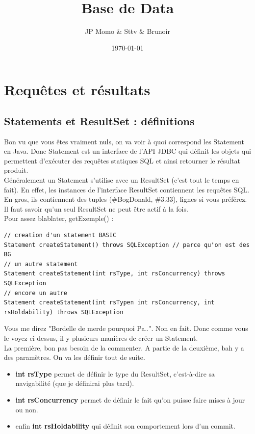 \documentclass{report}
\title{Base de Data}
\author{JP Momo \& Sttv \& Brunoir}
\date{\today}
\begin{document}
\maketitle{}

\chapter{Requêtes et résultats}
\section{Statements et ResultSet : définitions}

Bon vu que vous êtes vraiment nuls, on va voir à quoi correspond les Statement en Java. Donc Statement est un interface de l'API JDBC qui définit les objets qui permettent d'exécuter des requêtes statiques SQL et ainsi retourner le résultat produit.\\
Généralement un Statement s'utilise avec un ResultSet (c'est tout le temps en fait). En effet, les instances de l'interface ResultSet contiennent les requêtes SQL. En gros, ils contiennent des tuples (\#BogDonald, \#3.33), lignes si vous préférez. Il faut savoir qu'un seul ResultSet ne peut être actif à la fois.\\
Pour assez blablater, getExemple() :
\begin{lstlisting}[style=MyJavaStyle]
// creation d'un statement BASIC
Statement createStatement() throws SQLException // parce qu'on est des BG
// un autre statement
Statement createStatement(int rsType, int rsConcurrency) throws SQLException
// encore un autre
Statement createStatement(int rsTypen int rsConcurrency, int rsHoldability) throws SQLException
\end{lstlisting}
Vous me direz "Bordelle de merde pourquoi Pa..". Non en fait. Donc comme vous le voyez ci-dessus, il y plusieurs manières de créer un Statement.\\
La première, bon pas besoin de la commenter. A partie de la deuxième, bah y a des paramètres. On va les définir tout de suite.\\
\begin{itemize}
\item \textbf{int rsType} permet de définir le type du ResultSet, c'est-à-dire sa navigabilité (que je définirai plus tard).
\item \textbf{int rsConcurrency} permet de définir le fait qu'on puisse faire mises à jour ou non.
\item enfin \textbf{int rsHoldability} qui définit son comportement lors d'un commit.\\
\end{itemize}
\end{document}
